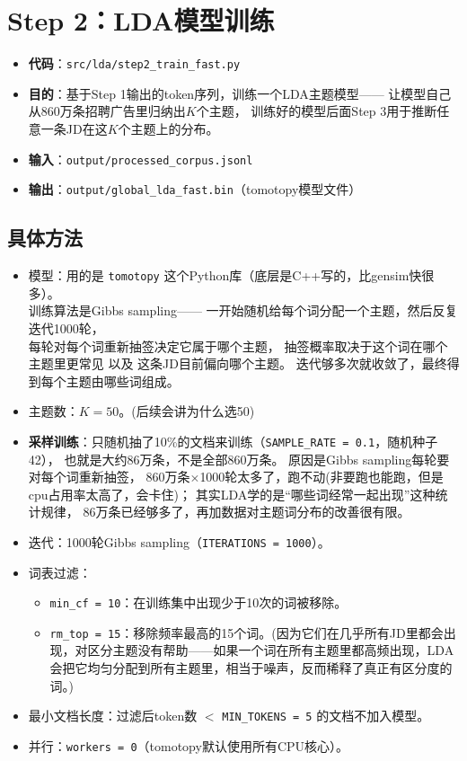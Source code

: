 \documentclass[12pt,a4paper]{ctexart}
\begin{document}
\section{Step 2：LDA模型训练}
\label{sec:step2}

\begin{itemize}[leftmargin=2em]
\item \textbf{代码}：\texttt{src/lda/step2\_train\_fast.py}
\item \textbf{目的}：基于Step 1输出的token序列，训练一个LDA主题模型——
让模型自己从860万条招聘广告里归纳出$K$个主题，
训练好的模型后面Step 3用于推断任意一条JD在这$K$个主题上的分布。
\item \textbf{输入}：\texttt{output/processed\_corpus.jsonl}
\item \textbf{输出}：\texttt{output/global\_lda\_fast.bin}（tomotopy模型文件）
\end{itemize}

\subsection{具体方法}

\begin{itemize}
\item 模型：用的是 \texttt{tomotopy} 这个Python库（底层是C++写的，比gensim快很多）。
\\训练算法是Gibbs sampling——
一开始随机给每个词分配一个主题，然后反复迭代1000轮，
\\每轮对每个词重新抽签决定它属于哪个主题，
抽签概率取决于这个词在哪个主题里更常见 以及 这条JD目前偏向哪个主题。
迭代够多次就收敛了，最终得到每个主题由哪些词组成。
\item 主题数：$K = 50$。(后续会讲为什么选50)
\item \textbf{采样训练}：只随机抽了10\%的文档来训练（\texttt{SAMPLE\_RATE = 0.1}，随机种子42），
也就是大约86万条，不是全部860万条。
原因是Gibbs sampling每轮要对每个词重新抽签，
860万条$\times$1000轮太多了，跑不动(非要跑也能跑，但是cpu占用率太高了，会卡住)；
其实LDA学的是``哪些词经常一起出现''这种统计规律，
86万条已经够多了，再加数据对主题词分布的改善很有限。
\item 迭代：1000轮Gibbs sampling（\texttt{ITERATIONS = 1000}）。
\item 词表过滤：
\begin{itemize}
\item \texttt{min\_cf = 10}：在训练集中出现少于10次的词被移除。
\item \texttt{rm\_top = 15}：移除频率最高的15个词。(因为它们在几乎所有JD里都会出现，对区分主题没有帮助——如果一个词在所有主题里都高频出现，LDA会把它均匀分配到所有主题里，相当于噪声，反而稀释了真正有区分度的词。)
\end{itemize}
\item 最小文档长度：过滤后token数 $<$ \texttt{MIN\_TOKENS = 5} 的文档不加入模型。
\item 并行：\texttt{workers = 0}（tomotopy默认使用所有CPU核心）。
\end{itemize}
\end{document}
